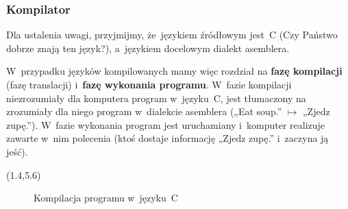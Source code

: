 \documentclass[10pt,t]{beamer}
\begin{document}
\begin{frame}
  \frametitle{Kompilator}

  \vspace{-0.75em}


  Dla ustalenia uwagi, przyjmijmy, że~językiem źródłowym jest~C
  (Czy Państwo dobrze znają ten język?), a~językiem docelowym dialekt
  asemblera.

  W~przypadku języków kompilowanych mamy więc rozdział na \textbf{fazę
    kompilacji} (fazę translacji) i~\textbf{fazę wykonania programu}.
  W~fazie kompilacji niezrozumiały dla komputera program w~języku~C,
  jest tłumaczony na zrozumiały dla niego program w~dialekcie asemblera
  („Eat soup.” $\mapsto$ „Zjedz zupę.”). W~fazie wykonania program jest
  uruchamiany i~komputer realizuje zawarte w~nim polecenia (ktoś dostaje
  informację „Zjedz zupę.” i~zaczyna ją jeść).




  \begin{textblock}{10.1}(1.4,5.6)

    \begin{figure}

      \label{fig:Translator-04}



      \caption{Kompilacja programu w~języku~C}


    \end{figure}

  \end{textblock}

\end{frame}
\end{document}
